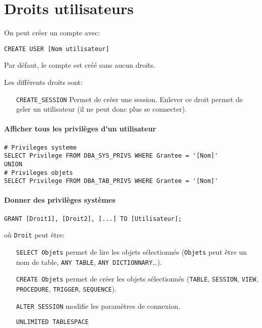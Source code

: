 \documentclass[10pt,a4paper,french]{article}
\begin{document}
\section{Droits utilisateurs}

On peut créer un compte avec:
\begin{verbatim}
CREATE USER [Nom utilisateur]
\end{verbatim}

Par défaut, le compte est créé sans aucun droits.

Les différents droits sont:
\begin{itemize}
\item[\tt CREATE\_SESSION] Permet de créer une session. Enlever ce droit permet de geler un utilisateur (il ne peut donc plus se connecter).
\end{itemize}

\paragraph{Afficher tous les privilèges d'un utilisateur}
\begin{verbatim}
# Privileges systeme
SELECT Privilege FROM DBA_SYS_PRIVS WHERE Grantee = '[Nom]'
UNION
# Privileges objets
SELECT Privilege FROM DBA_TAB_PRIVS WHERE Grantee = '[Nom]'
\end{verbatim}

\paragraph{Donner des privilèges systèmes}
\begin{verbatim}
GRANT [Droit1], [Droit2], [...] TO [Utilisateur];
\end{verbatim}
où {\tt Droit} peut être:
\begin{itemize}
\item[\tt SELECT Objets] permet de lire les objets sélectionnés ({\tt Objets} peut être un nom de table, {\tt ANY TABLE}, {\tt ANY DICTIONNARY}\ldots).
\item[\tt CREATE Objets] permet de créer les objets sélectionnés ({\tt TABLE}, {\tt SESSION}, {\tt VIEW}, {\tt PROCEDURE}, {\tt TRIGGER}, {\tt SEQUENCE}).
\item[\tt ALTER SESSION] modifie les paramètres de connexion.
\item[\tt UNLIMITED TABLESPACE]
\end{itemize}

\appendix %

\printglossaries
\end{document}
